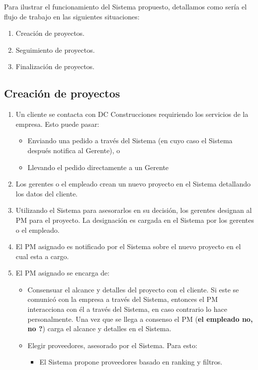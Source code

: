 Para ilustrar el funcionamiento del Sistema propuesto, detallamos como sería el flujo de trabajo en las siguientes situaciones:
\begin{enumerate}
    \item Creación de proyectos.
    \item Seguimiento de proyectos.
    \item Finalización de proyectos.
\end{enumerate}

\subsection{Creación de proyectos}

\begin{enumerate}
    \item Un cliente se contacta con DC Construcciones requiriendo los servicios de la empresa. Esto puede pasar:
        \begin{itemize}
            \item Enviando una pedido a través del Sistema (en cuyo caso el Sistema después notifica al Gerente), o
            \item Llevando el pedido directamente a un Gerente
        \end{itemize}
    \item Los gerentes o el empleado crean un nuevo proyecto en el Sistema detallando los datos del cliente.
    \item Utilizando el Sistema para asesorarlos en su decisión, los gerentes designan al PM para el proyecto.
        La designación es cargada en el Sistema por los gerentes o el empleado.
    \item El PM asignado es notificado por el Sistema sobre el nuevo proyecto en el cual esta a cargo.
    \item El PM asignado se encarga de:
        \begin{itemize}
            \item Consensuar el alcance y detalles del proyecto con el cliente. Si este se comunicó con la empresa a través del Sistema, entonces el PM interacciona con él a través del Sistema, en caso contrario lo hace personalmente. Una vez que se llega a consenso el PM (\textbf{el empleado no, no ?}) carga el alcance y detalles en el Sistema.
            \item Elegir proveedores, asesorado por el Sistema. Para esto:
                \begin{itemize}
                    \item El Sistema propone proveedores basado en ranking y filtros.

\end{itemize}
\end{itemize}
\end{enumerate}
